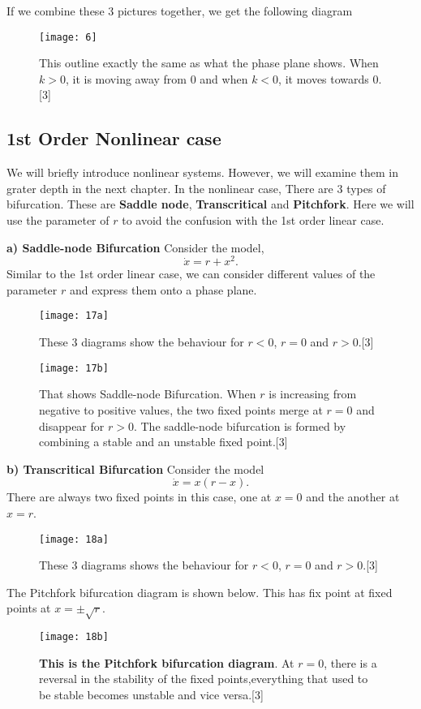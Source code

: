 \documentclass[a4paper]{report}
\theoremstyle{definition}
\begin{document}
If we combine these 3 pictures together, we get the following diagram
\begin{figure}[H]
\texttt{[image: 6]}
\caption{This outline exactly the same as what the phase plane shows. When $k>0$, it is moving away from $0$ and when $k<0$, it moves towards $0$.[3]}
\label{fig:figure32}
\end{figure} 
\subsection{1st Order Nonlinear case}
We will briefly introduce nonlinear systems. However, we will examine them in grater depth in the next chapter. In the  nonlinear case, There are 3 types of bifurcation. These are \textbf{Saddle node}, \textbf{Transcritical} and \textbf{Pitchfork}. Here we will use the parameter of $r$ to avoid the confusion with the 1st order linear case.

\textbf{a) Saddle-node Bifurcation}
Consider the model,
\begin{equation}
\label{equ:3.6.1}
\dot{x}=r+x^2.
\end{equation}
Similar to the 1st order linear case, we can consider different values of the parameter $r$ and express them onto a phase plane. 
\begin{figure}[H]
\texttt{[image: 17a]}
\caption{These 3 diagrams show the behaviour for $r<0$, $r=0$ and $r>0$.[3]}
\label{fig:figre3}
\end{figure}

\begin{figure}[H]
\texttt{[image: 17b]}
\caption{That shows Saddle-node Bifurcation. When $r$ is increasing from negative to positive values, the two fixed points merge at $r = 0$ and
disappear for $r > 0$. The saddle-node bifurcation is formed by combining a stable and an unstable fixed point.[3]}
\label{fig:figure3}
\end{figure}

\textbf{b) Transcritical Bifurcation}
Consider the model
\begin{equation}
\label{equ:3.6.2}
\dot{x}=x(r-x).
\end{equation}
There are always two fixed points in this case, one at $x=0$ and the another at $x=r$.  
\begin{figure}[H]
\texttt{[image: 18a]}
\caption{These 3 diagrams shows the behaviour for $r<0$, $r=0$ and $r>0$.[3]}
\label{fig:figure34}
\end{figure}
The Pitchfork bifurcation diagram is shown below. This has fix point at
fixed points at $x=\pm \sqrt{r}$.
\begin{figure}[H]
\texttt{[image: 18b]}
\caption{\textbf{This is the Pitchfork bifurcation diagram}. At $r=0$, there is a reversal in the stability of the fixed points,everything that used to be stable becomes unstable and vice versa.[3]}
\label{fig:figure33}
\end{figure}
\end{document}
